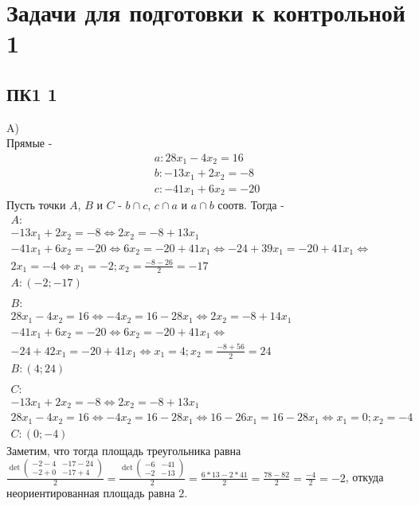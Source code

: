 \newpage
	\section{Задачи для подготовки к контрольной 1}
		\subsection{ПК1 1}
		A)\\
		Прямые -
		\begin{gather*}
		a: 28x_1 - 4x_2 = 16 \\
		b: -13x_1 + 2x_2 = -8 \\
		c: -41x_1 + 6x_2 = -20 
		\end{gather*}
		Пусть точки $A$, $B$ и $C$ - $b \cap c$, $c \cap a$ и $a \cap b$ соотв. Тогда -
		\begin{gather*}
		A:\\
		-13x_1 + 2x_2 = -8 \Longleftrightarrow 2x_2 = -8 + 13x_1 \\
		-41x_1 + 6x_2 = -20 \Longleftrightarrow 6x_2 = -20 + 41x_1 \Longleftrightarrow -24 + 39x_1 = -20 + 41x_1 \Longleftrightarrow \\
		2x_1 = -4 \Longleftrightarrow x_1 = -2; x_2 = \frac{-8 - 26}{2} = -17 \\
		A: (-2;-17)
		\\ \\
		B:\\
		28x_1 - 4x_2 = 16 \Longleftrightarrow -4x_2 = 16 - 28x_1 \Longleftrightarrow 2x_2 = -8 + 14x_1 \\
		-41x_1 + 6x_2 = -20 \Longleftrightarrow 6x_2 = -20 + 41x_1 \Longleftrightarrow \\
		-24 + 42x_1 = -20 + 41x_1 \Longleftrightarrow x_1 = 4; x_2 = \frac{-8 + 56}{2} = 24 \\
		B: (4;24)
		\\ \\
		C:\\
		-13x_1 + 2x_2 = -8 \Longleftrightarrow 2x_2 = -8 + 13x_1 \\
		28x_1 - 4x_2 = 16 \Longleftrightarrow -4x_2 = 16 - 28x_1 \Longleftrightarrow 16 - 26x_1 = 16 - 28x_1 \Longleftrightarrow x_1 = 0; x_2 = -4 \\
		C: (0;-4)
		\end{gather*}
		Заметим, что тогда площадь треугольника равна $\frac{\det \begin{pmatrix} -2 - 4 & -17 - 24 \\ - 2 + 0 & -17 + 4 \end{pmatrix}}{2} = \frac{\det \begin{pmatrix} -6 & -41 \\ -2 & -13 \end{pmatrix}}{2} = \frac{6*13 - 2*41}{2} = \frac{78 - 82}{2} = \frac{-4}{2} = -2$, откуда неориентированная площадь равна $2$.
